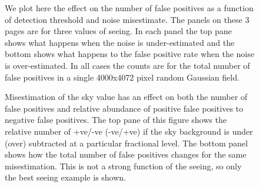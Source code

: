 \documentclass[prd, nofootinbib, floatfix, 11pt,tightenlines,times]{article}
\begin{document}
\begin{figure}
  \centering 
  \caption[]{ We plot here the effect on the number of false positives
    as a function of detection threshold and noise misestimate.  The
    panels on these 3 pages are for three values of seeing.  In each panel the
    top pane shows what happens when the noise is under-estimated and
    the bottom shows what happens to the false positive rate when the
    noise is over-estimated.  In all cases the counts are for the
    total number of false positives in a single 4000x4072 pixel random
    Gaussian field.
    }
  \label{fig-fpthresh}
\end{figure}
\clearpage
\begin{figure}
  \ContinuedFloat 
  \centering 
\end{figure} 
\clearpage
\begin{figure}
  \ContinuedFloat 
  \centering 
\end{figure} 

\begin{figure}
\centering
{}
\caption{
Misestimation of the sky value has an effect on both the number of false positives and relative abundance of positive false positives to negative false positives.
The top pane of this figure shows the relative number of +ve/-ve (-ve/+ve) if the sky background is under (over) subtracted at a particular fractional level.  The 
bottom panel shows how the total number of false positives changes for the same misestimation.  This is not a strong function of the seeing, so only the best
seeing example is shown.
}
\label{fig-skythresh}
\end{figure}
\end{document}
